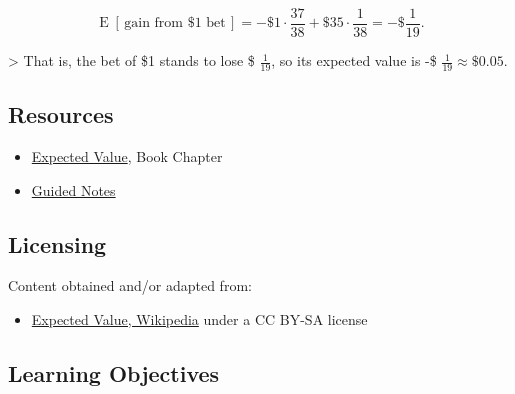 $$\operatorname{E}[\,\text{gain from }\$1\text{ bet}\,] = -\$1 \cdot \frac{37}{38} + \$35 \cdot \frac{1}{38} = -\$\frac{1}{19}.$$



> That is, the bet of \$1 stands to lose \$ $\frac{1}{19}$, so its
expected value is -\$ $\frac{1}{19} \approx \$ 0.05.$




\subsection{Resources}
\label{sss:reso-55b5}




\begin{itemize}
    \item \href{https://mathresearch.utsa.edu/wikiFiles/MAT1053/Expected_Value/MAT1053_M12.2Expected_Value.pdf}{Expected Value}, Book Chapter
    \item \href{https://mathresearch.utsa.edu/wikiFiles/MAT1053/Expected_Value/MAT1053_M12.2Expected_Value.pdf}{Guided Notes}
\end{itemize}


\subsection{Licensing}
\label{sss:lice-7352}




Content obtained and/or adapted from:



\begin{itemize}
    \item \href{https://en.wikipedia.org/wiki/Expected_value}{Expected Value, Wikipedia} under a CC BY-SA license
\end{itemize}


\subsection{Learning Objectives}
\label{ssec:lear-fe6e}


